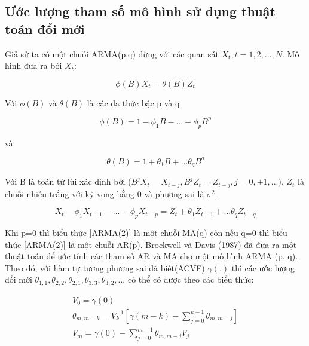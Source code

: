 \subsection{Ước lượng tham số mô hình sử dụng thuật toán đổi mới}
     Giả sử ta có một chuỗi ARMA(p,q) dừng với các quan sát $X_{t}, t=1,2,...,N$. Mô hình  đưa ra bởi $X_t$:\par
     \begin{equation}
         \phi(B)X_{t}=\theta(B)Z_{t}
     \end{equation}\par
     Với $\phi(B)$ và $\theta(B)$ là các đa thức bậc p và q\par
     \begin{equation}
         \phi(B)=1-\phi_{1}B-...-\phi_{p}B^{p}
     \end{equation}\par
     và\par
     \begin{equation}\label{ARMA(1)}
         \theta(B)=1+\theta_{1}B+...\theta_{q}B^{q}
     \end{equation}\par
     Với B là toán tử lùi xác định bởi ($B^{j}X_{t}=X_{t-j}, B^{j}Z_{t}=Z_{t-j}, j=0,\pm1,...$), $Z_{t}$ là chuỗi nhiễu trắng với kỳ vọng bằng 0 và phương sai là $\sigma^{2}$.\par
     \begin{equation}\label{ARMA(2)}
         X_{t}-\phi_{1}X_{t-1}-...-\phi_{p}X_{t-p}=Z_{t}+\theta_{1}Z_{t-1}+...\theta_{q}Z_{t-q}
     \end{equation}\par
     Khi p=0 thì biểu thức \eqref{ARMA(2)} là một chuỗi MA(q) còn nếu q=0 thì biểu thức \eqref{ARMA(2)} là một chuỗi AR(p). Brockwell và Davis (1987) đã đưa ra một thuật toán để ước tính các tham số AR và MA cho một mô hình ARMA (p, q). Theo đó, với hàm tự tương phương sai đã biết(ACVF) $\gamma(.)$ thì các ước lượng đổi mới $\theta_{1,1},\theta_{2,2},\theta_{2,1},\theta_{3,3},\theta_{3,2},...$ có thể có được theo các biểu thức:\par
     \begin{align}
         V_{0}=\gamma(0)\label{ARMA(3)}\\
         \theta_{m,m-k}=V_{k}^{-1}[\gamma(m-k)-\sum_{j=0}^{k-1}\theta_{m,m-j}]\label{ARMA(4)}\\
         V_{m}=\gamma(0)-\sum_{j=0}^{m-1}\theta_{m,m-j}V_{j}\label{ARMA(5)}
     \end{align}\par
